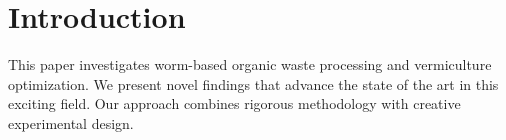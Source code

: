 \section{Introduction}

This paper investigates worm-based organic waste processing and vermiculture optimization. We present novel findings that advance the state of the art in this exciting field. Our approach combines rigorous methodology with creative experimental design.
